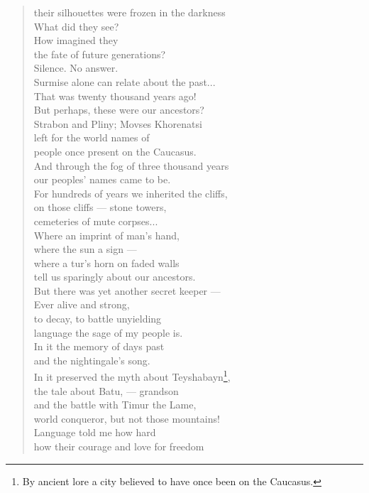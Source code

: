 \documentclass[smalldemyvopaper,11pt,twoside,onecolumn,openright,extrafontsizes]{memoir}
\begin{document}
\begin{verse}
their silhouettes were frozen in the darkness \\
What did they see?\\
How imagined they\\
the fate of future generations?\\
Silence. No answer.\\
Surmise alone can relate about the past...\\
That was twenty thousand years ago!\\
But perhaps, these were our ancestors?\\
Strabon and Pliny; Movses Khorenatsi\\
left for the world names of\\
people once present on the Caucasus.\\
And through the fog of three thousand years\\
our peoples' names came to be.\\
For hundreds of years we inherited the cliffs,\\
on those cliffs — stone towers,\\
cemeteries of mute corpses...\\
Where an imprint of man's hand,\\
where the sun a sign — \\
where a tur's horn on faded walls\\
tell us sparingly about our ancestors.\\
But there was yet another secret keeper — \\
Ever alive and strong,\\
to decay, to battle unyielding\\
language the sage of my people is.\\
In it the memory of days past\\
and the nightingale's song.\\
In it preserved the myth about Teyshabayn\footnote{By ancient lore a city believed to have once been on the Caucasus.},\\
the tale about Batu, — grandson  \\
and the battle with Timur the Lame,\\
world conqueror, but not those mountains!\\
Language told me how hard \\
how their courage and love for freedom\\

\end{verse}
\end{document}
